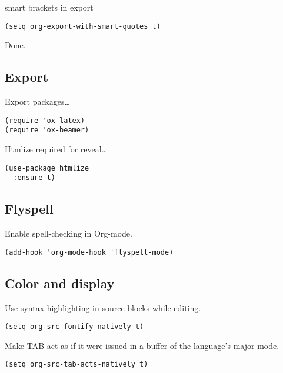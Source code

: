 \documentclass[12pt]{article}
\begin{document}
smart brackets in export

\lstset{language=Lisp,label= ,caption= ,captionpos=b,numbers=none}
\begin{lstlisting}
(setq org-export-with-smart-quotes t)
\end{lstlisting}

Done.
\subsection{Export}
\label{sec:orgcb7c017}

Export packages\ldots{}

\lstset{language=Lisp,label= ,caption= ,captionpos=b,numbers=none}
\begin{lstlisting}
(require 'ox-latex)
(require 'ox-beamer)
\end{lstlisting}

Htmlize required for reveal\ldots{}

\lstset{language=Lisp,label= ,caption= ,captionpos=b,numbers=none}
\begin{lstlisting}
(use-package htmlize
  :ensure t)
\end{lstlisting}

\subsection{Flyspell}
\label{sec:orgdabbae7}
Enable spell-checking in Org-mode.
\lstset{language=Lisp,label= ,caption= ,captionpos=b,numbers=none}
\begin{lstlisting}
(add-hook 'org-mode-hook 'flyspell-mode)
\end{lstlisting}

\subsection{Color and display}
\label{sec:org7c71ab2}

Use syntax highlighting in source blocks while editing.
\lstset{language=Lisp,label= ,caption= ,captionpos=b,numbers=none}
\begin{lstlisting}
(setq org-src-fontify-natively t)
\end{lstlisting}

Make TAB act as if it were issued in a buffer of the language’s major mode.
\lstset{language=Lisp,label= ,caption= ,captionpos=b,numbers=none}
\begin{lstlisting}
(setq org-src-tab-acts-natively t)
\end{lstlisting}
\end{document}
